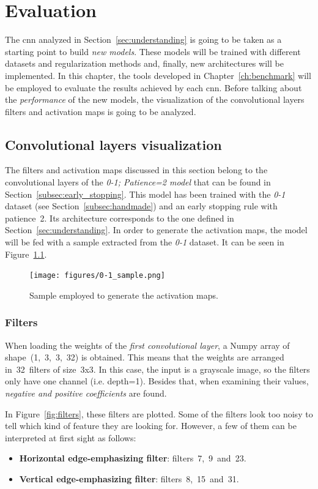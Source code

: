 \chapter{Evaluation}\label{sec:new_models}
The \gls{cnn} analyzed in Section~\ref{sec:understanding} is going to be taken as a starting point to build \emph{new models}. These models will be trained with different datasets and regularization methods and, finally, new architectures will be implemented. In this chapter, the tools developed in Chapter~\ref{ch:benchmark} will be employed to evaluate the results achieved by each \gls{cnn}. Before talking about the \emph{performance} of the new models, the visualization of the convolutional layers filters and activation maps is going to be analyzed.

\section{Convolutional layers visualization}
The filters and activation maps discussed in this section belong to the convolutional layers of the \emph{\textit{0-1; Patience=2} model} that can be found in Section~\ref{subsec:early_stopping}. This model has been trained with the \textit{0-1} dataset (see Section~\ref{subsec:handmade}) and an early stopping rule with patience~2. Its architecture corresponds to the one defined in Section~\ref{sec:understanding}. In order to generate the activation maps, the model will be fed with a sample extracted from the \textit{0-1} dataset. It can be seen in Figure~\ref{fig:sample}.
\begin{figure}
	\centering
	\texttt{[image: figures/0-1\_sample.png]}
	\caption{Sample employed to generate the activation maps.}
	\label{fig:sample}
\end{figure}

\subsection{Filters}
When loading the weights of the \emph{first convolutional layer}, a Numpy array of shape~(1,~3,~3,~32) is obtained. This means that the weights are arranged in~32~filters of size~3x3. In this case, the input is a grayscale image, so the filters only have one channel (i.e. depth=1). Besides that, when examining their values, \emph{negative and positive coefficients} are found.

In Figure~\ref{fig:filters}, these filters are plotted. Some of the filters look too noisy to tell which kind of feature they are looking for. However, a few of them can be interpreted at first sight as follows:
\begin{itemize}
	\item \textbf{Horizontal edge-emphasizing filter}: filters~7,~9~and~23.
	\item \textbf{Vertical edge-emphasizing filter}: filters~8,~15~and~31.	
\end{itemize}

